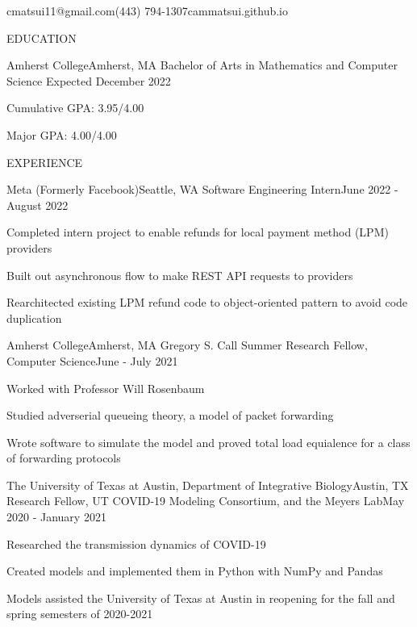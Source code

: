 \documentclass{article}
\begin{document}
\thispagestyle{empty}

        {cmatsui11@gmail.com}{(443) 794-1307}{cammatsui.github.io}

\begin{bigsection}{EDUCATION}
    \begin{sectionitem}{Amherst College}{Amherst, MA}
            {Bachelor of Arts in Mathematics and Computer Science}
            {Expected December 2022}
        \item Cumulative GPA: 3.95/4.00
        \item Major GPA: 4.00/4.00
    \end{sectionitem}
\end{bigsection}

\begin{bigsection}{EXPERIENCE}
    \begin{sectionitem}{Meta (Formerly Facebook)}{Seattle, WA}
            {Software Engineering Intern}{June 2022 - August 2022}
        \item Completed intern project to enable refunds for local payment method (LPM) providers
        \item Built out asynchronous flow to make REST API requests to providers
        \item Rearchitected existing LPM refund code to object-oriented pattern to avoid code 
            duplication
    \end{sectionitem}

    \begin{sectionitem}{Amherst College}{Amherst, MA}
            {Gregory S. Call Summer Research Fellow, Computer Science}{June - July 2021}
        \item Worked with Professor Will Rosenbaum
        \item Studied adverserial queueing theory, a model of packet forwarding
        \item Wrote software to simulate the model and proved total load equialence for a class of forwarding protocols
    \end{sectionitem}

    \begin{sectionitem}{The University of Texas at Austin, Department of Integrative Biology}{Austin, TX}
            {Research Fellow, UT COVID-19 Modeling Consortium, and the Meyers Lab}{May 2020 - January 2021}
        \item Researched the transmission dynamics of COVID-19
        \item Created models and implemented them in Python with NumPy and Pandas
        \item Models assisted the University of Texas at Austin in reopening for the fall and spring semesters of 2020-2021
    \end{sectionitem}
\end{bigsection}
\end{document}
